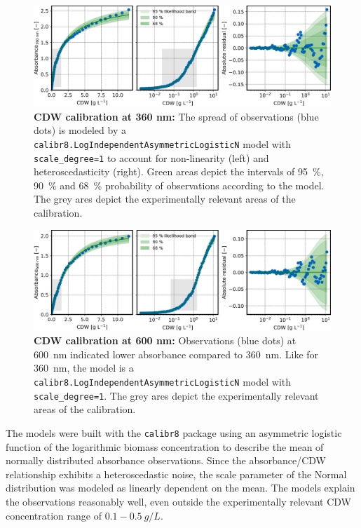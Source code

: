 \documentclass[sn-standardnature]{sn-jnl}%
\theoremstyle{thmstyleone}%
\theoremstyle{thmstyletwo}%
\theoremstyle{thmstylethree}%
\begin{document}
\begin{figure}[h]
    \centering
    \includegraphics[width=1.0\textwidth]{figures/cm_biomass_A360.png}
    \caption{
        \textbf{CDW calibration at 360 nm:}
        The spread of observations (blue dots) is modeled by a \texttt{calibr8.LogIndependentAsymmetricLogisticN} model with \texttt{scale\_degree=1} to account for non-linearity (left) and heteroscedasticity (right). 
        Green areas depict the intervals of 95~\%, 90~\% and 68~\% probability of observations according to the model. The grey ares depict the experimentally relevant areas of the calibration.
    }
    \label{fig_cmXA360}
\end{figure}

\begin{figure}[h]
    \centering
    \includegraphics[width=1.0\textwidth]{figures/cm_biomass_A600.png}
    \caption{
        \textbf{CDW calibration at 600 nm:}
        Observations (blue dots) at 600~nm indicated lower absorbance compared to 360~nm. Like for 360~nm, the model is a \texttt{calibr8.LogIndependentAsymmetricLogisticN} model with \texttt{scale\_degree=1}.
        The grey ares depict the experimentally relevant areas of the calibration.
    }
    \label{fig_cmXA600}
\end{figure}

The models were built with the \texttt{calibr8} package \cite{calibr8,calibr8Paper} using an asymmetric logistic function of the logarithmic biomass concentration to describe the mean of normally distributed absorbance observations.
Since the absorbance/CDW relationship exhibits a heteroscedastic noise, the scale parameter of the Normal distribution was modeled as linearly dependent on the mean.
The models explain the observations reasonably well, even outside the experimentally relevant CDW concentration range of $0.1-0.5~g/L$.
\end{document}
